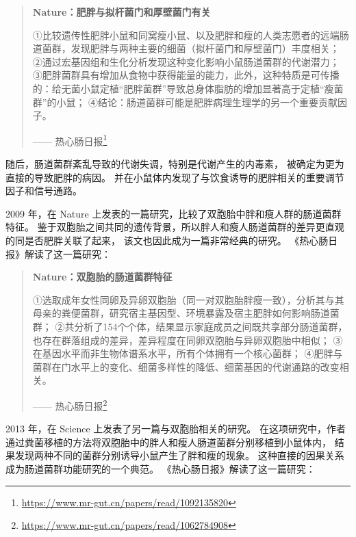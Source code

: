 \documentclass[]{ctexbook}
\renewcommand{\href}[2]{#2\footnote{\url{#1}}}
\begin{document}
\begin{quote}
\textbf{Nature：肥胖与拟杆菌门和厚壁菌门有关}

①比较遗传性肥胖小鼠和同窝瘦小鼠、以及肥胖和瘦的人类志愿者的远端肠道菌群，发现肥胖与两种主要的细菌（拟杆菌门和厚壁菌门）丰度相关；
②通过宏基因组和生化分析发现这种变化影响小鼠肠道菌群的代谢潜力；
③肥胖菌群具有增加从食物中获得能量的能力，此外，这种特质是可传播的：给无菌小鼠定植``肥胖菌群''导致总身体脂肪的增加显著高于定植``瘦菌群''的小鼠；
④结论：肠道菌群可能是肥胖病理生理学的另一个重要贡献因子。

\begin{flushright}------ \href{https://www.mr-gut.cn/papers/read/1092135820}{热心肠日报}\end{flushright}
\end{quote}

随后，肠道菌群紊乱导致的代谢失调，特别是代谢产生的内毒素，
被确定为更为直接的导致肥胖的病因\citep{caniMetabolicEndotoxemiaInitiates2007, caniChangesGutMicrobiota2008}。
并在小鼠体内发现了与饮食诱导的肥胖相关的重要调节因子和信号通路\citep{backhedMechanismsUnderlyingResistance2007}。

2009 年，在 Nature 上发表的一篇研究，比较了双胞胎中胖和瘦人群的肠道菌群特征\citep{falonyPopulationlevelAnalysisGut2016}。
鉴于双胞胎之间共同的遗传背景，所以胖人和瘦人肠道菌群的差异更直观的同是否肥胖关联了起来，
该文也因此成为一篇非常经典的研究。
《热心肠日报》解读了这一篇研究：

\begin{quote}
\textbf{Nature：双胞胎的肠道菌群特征}

①选取成年女性同卵及异卵双胞胎（同一对双胞胎胖瘦一致），分析其与其母亲的粪便菌群，研究宿主基因型、环境暴露及宿主肥胖如何影响肠道菌群；
②共分析了154个个体，结果显示家庭成员之间既共享部分肠道菌群，也存在群落组成的差异，差异程度在同卵双胞胎与异卵双胞胎中相似；
③在基因水平而非生物体谱系水平，所有个体拥有一个核心菌群；
④肥胖与菌群在门水平上的变化、细菌多样性的降低、细菌基因的代谢通路的改变相关。

\begin{flushright}------ \href{https://www.mr-gut.cn/papers/read/1062784908}{热心肠日报}\end{flushright}
\end{quote}

2013 年，在 Science 上发表了另一篇与双胞胎相关的研究\citep{ridauraGutMicrobiotaTwins2013a}。
在这项研究中，作者通过粪菌移植的方法将双胞胎中的胖人和瘦人肠道菌群分别移植到小鼠体内，
结果发现两种不同的菌群分别诱导小鼠产生了胖和瘦的现象。
这种直接的因果关系成为肠道菌群功能研究的一个典范。
《热心肠日报》解读了这一篇研究：
\end{document}
